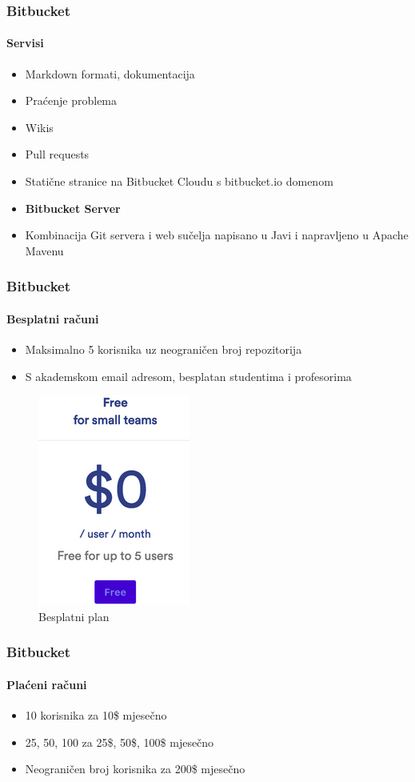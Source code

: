 \documentclass[12pt, hyperref={unicode}]{beamer}
\begin{document}
\begin{frame}[t]
	\frametitle{Bitbucket}
	\framesubtitle{Servisi}
	\pause
	\setlength{\leftmargini}{0in}
	\begin{itemize}
		\item Markdown formati, dokumentacija\pause
		\item Praćenje problema\pause
		\item Wikis\pause
		\item Pull requests\pause
		\item Statične stranice na Bitbucket Cloudu s bitbucket.io domenom\pause
        \item \textbf{Bitbucket Server} \pause
	    \item Kombinacija Git servera  i web sučelja napisano u Javi i napravljeno u Apache Mavenu
	\end{itemize}
\end{frame}




\begin{frame}[t]
	\frametitle{Bitbucket}
	\framesubtitle{Plaćeni računi}
	\pause
	\setlength{\leftmargini}{0in}
	\begin{itemize}
		\item 10 korisnika za 10\$ mjesečno\pause
		\item 25, 50, 100 za 25\$, 50\$, 100\$ mjesečno\pause
		\item Neograničen broj korisnika za 200\$ mjesečno
	\end{itemize}
\end{frame}
\end{document}
